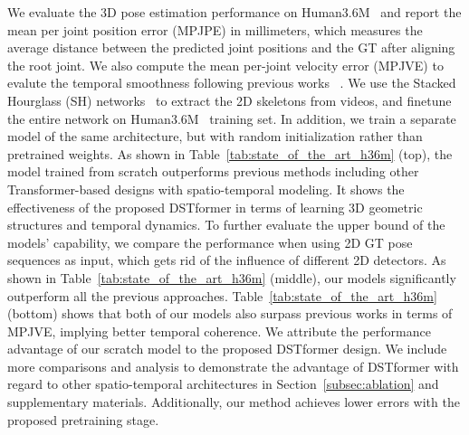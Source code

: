 We evaluate the 3D pose estimation performance on Human3.6M~\cite{h36m_pami} and report the mean per joint position error (MPJPE) in millimeters, which measures the average distance between the predicted joint positions and the GT after aligning the root joint. We also compute the mean per-joint velocity error (MPJVE) to evalute the temporal smoothness following previous works ~\cite{zheng20213d, zhang2022mixste}.
We use the Stacked Hourglass (SH) networks~\cite{newell2016stacked} to extract the 2D skeletons from videos, and finetune the entire network on Human3.6M~\cite{h36m_pami} training set. In addition, we train a separate model of the same architecture, but with random initialization rather than pretrained weights. As shown in Table~\ref{tab:state_of_the_art_h36m} (top), the model trained from scratch outperforms previous methods including other Transformer-based designs with spatio-temporal modeling. It shows the effectiveness of the proposed DSTformer in terms of learning 3D geometric structures and temporal dynamics. To further evaluate the upper bound of the models' capability, we compare the performance when using 2D GT pose sequences as input, which gets rid of the influence of different 2D detectors. As shown in Table~\ref{tab:state_of_the_art_h36m} (middle), our models significantly outperform all the previous approaches. Table~\ref{tab:state_of_the_art_h36m} (bottom) shows that both of our models also surpass previous works in terms of MPJVE, implying better temporal coherence. We attribute the performance advantage of our scratch model to the proposed DSTformer design. We include more comparisons and analysis to demonstrate the advantage of DSTformer with regard to other spatio-temporal architectures in Section~\ref{subsec:ablation} and supplementary materials. Additionally, our method achieves lower errors with the proposed pretraining stage. 






















    
    
    
    
    
    
    
    
    
    
